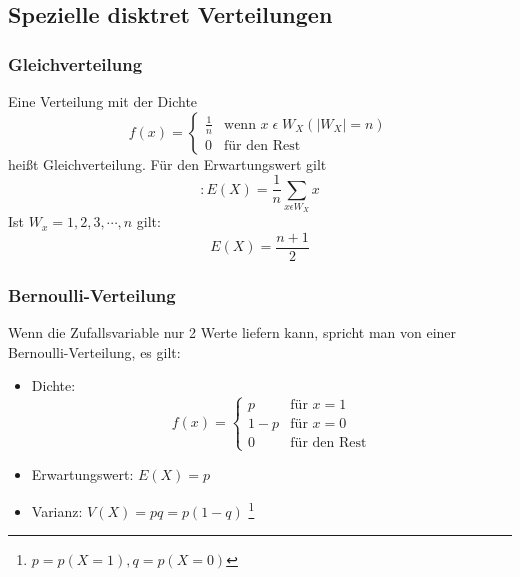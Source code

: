 \documentclass[a4paper]{scrartcl}
\begin{document}
        \subsection{Spezielle disktret Verteilungen}
            \subsubsection{Gleichverteilung}
                Eine Verteilung mit der Dichte 
                \[f(x)=
                    \begin{cases}
                        \frac{1}{n} & \text{wenn } x \; \epsilon \; W_X (|W_X| = n)\\
                        0 & \text{für den Rest} 
                    \end{cases}
                \] 
                heißt Gleichverteilung. Für den Erwartungswert gilt 
                \begin{equation*}:
                    E(X) = \frac{1}{n} \sum\limits_{x\epsilon W_X} x
                \end{equation*}
                Ist  \(W_x = 1,2,3, \cdots ,n\) gilt: 
                \begin{equation*}
                    E(X) = \frac{n+1}{2}
                \end{equation*} 
            \subsubsection{Bernoulli-Verteilung}
                Wenn die Zufallsvariable nur 2 Werte liefern kann, spricht man von einer Bernoulli-Verteilung, es gilt:
                \begin{itemize}
                    \item Dichte: \[f(x)=
                                                        \begin{cases}
                                                            p     & \text{für } x = 1 \\
                                                            1 - p & \text{für } x = 0 \\
                                                            0     & \text{für den Rest} 
                                                        \end{cases}
                                                        \] 
                    \item Erwartungswert: \(E(X) = p \)
                    \item Varianz: \(V(X) = pq = p (1 - q)\) \footnote{\(p = p(X=1), q = p(X=0)\)} %
                \end{itemize}
\end{document}
